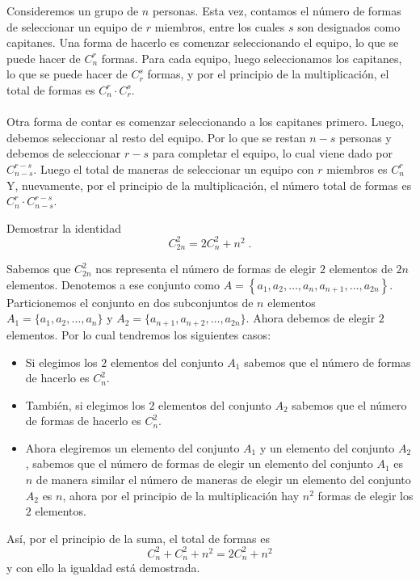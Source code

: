 \documentclass[12pt]{article}
\begin{document}
\begin{solucion}
 Consideremos un grupo de $n$ personas. Esta vez, contamos el
número de formas de seleccionar un equipo de $r$ miembros, entre
los cuales $s$ son designados como capitanes. Una forma de hacerlo es comenzar seleccionando el equipo, lo que se puede hacer de $\displaystyle C^r_n$ formas. Para cada equipo, luego seleccionamos los capitanes, lo que se puede hacer de $\displaystyle C^s_r$ formas, y por el principio de la multiplicación, el total de formas es $\displaystyle C^r_n\cdot C^s_r$.\\\\
Otra forma de contar es comenzar seleccionando a los capitanes
primero. Luego, debemos seleccionar al resto del equipo. Por lo que se restan $n-s$ personas y debemos de seleccionar $r-s$ para completar el equipo, lo cual viene dado por $\displaystyle C^{r-s}_{n-s}$. Luego el total de maneras de seleccionar un equipo con $r$ miembros es $\displaystyle C^r_n$ Y, nuevamente, por el principio de la multiplicación, el número total de formas es $\displaystyle C^r_n \cdot C^{r-s}_ {n-s}$. 
\end{solucion}

\begin{ejemplo}
Demostrar la identidad
\[C^2_{2n}=2C^2_n+n^2\;.\]
\end{ejemplo}

\begin{solucion}
Sabemos que $\displaystyle C^2_{2n}$ nos representa el número de formas de elegir $2$ elementos de $2n$ elementos. Denotemos a ese conjunto como $A=\left\{a_1,a_2,\ldots,a_n,a_{n+1},\ldots,a_{2n}\right\}$. Particionemos el conjunto en dos subconjuntos de $n$ elementos $A_1=\{a_1,a_2,\ldots,a_n\}$ y $A_2=\{a_{n+1},a_{n+2},\ldots,a_{2n}\}$.
Ahora debemos de elegir $2$ elementos. Por lo cual tendremos los siguientes casos:
\begin{itemize}
    \item Si elegimos los $2$ elementos del conjunto $A_1$ sabemos que el número de formas de hacerlo es $C^2_{n}$.
    \item También, si elegimos los $2$ elementos del conjunto $A_2$ sabemos que el número de formas de hacerlo es $C^2_{n}$.
    \item  Ahora elegiremos un elemento del conjunto $A_1$ y un elemento del conjunto $A_2$, sabemos que el número de formas de elegir un elemento del conjunto $A_1$ es $n$ de manera similar el número de maneras de elegir un elemento del conjunto $A_2$ es $n$, ahora por el principio de la multiplicación hay $n^2$ formas de elegir los $2$ elementos. 
\end{itemize}
Así, por el principio de la suma, el total de formas es
\[C^2_n+C^2_n+n^2=2C^2_n+n^2\]
y con ello la igualdad está demostrada.
\end{solucion}
\end{document}
